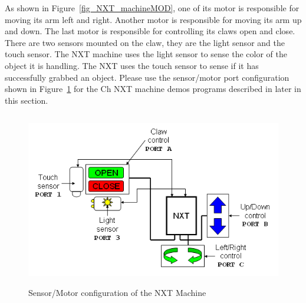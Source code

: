 \documentclass[11pt]{article}
\begin{document}
As shown in Figure~\ref{fig_NXT_machineMOD}, one of its motor is responsible for moving its arm 
left and right. Another motor is responsible for moving its arm up and down. The last motor is 
responsible for controlling its claws open and close. There are two sensors mounted on the claw, 
they are the light sensor and the touch sensor. The NXT machine uses the light sensor to sense the 
color of the object it is handling. The NXT uses the touch sensor to sense if it has successfully 
grabbed an object. Please use the sensor/motor port configuration shown in Figure~\ref{fig_NXT_mach_port} 
for the Ch NXT machine demos programs described in later in this section.
\begin{figure}[H]
  \begin{center}
    \includegraphics[height=3in]{figure/mindstorm/NXT_mach_port.png}
    \caption{Sensor/Motor configuration of the NXT Machine\label{fig_NXT_mach_port}}
  \end{center}
\end{figure}

\newpage
\end{document}
